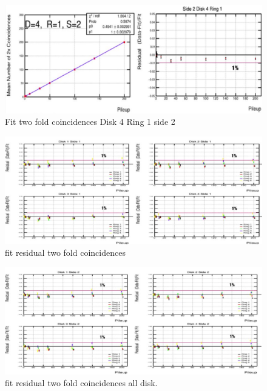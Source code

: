   


\begin{figure}[!htp]
\centering
\includegraphics[width=1\textwidth]{ashish_thesis/D4R1S2_linear_fit_twofoldcoin.png}
\caption{%
  Fit two fold coincidences Disk 4 Ring 1 side 2
}
\label{fig:cluster_ring}
\end{figure}


\begin{figure}[!htp]
\centering
\includegraphics[width=1\textwidth]{ashish_thesis/Alldisk_S1_twofoldcoin_residuals.png}
\caption{%
   fit residual two fold coincidences 
}
\label{fig:cluster_ring}
\end{figure}




\begin{figure}[!htp]
\centering
\includegraphics[width=1\textwidth]{ashish_thesis/Alldisk_S2_twofoldcoin_residuals.png}
\caption{%
  fit residual two fold coincidences all disk.
}
\label{fig:cluster_ring}
\end{figure}


